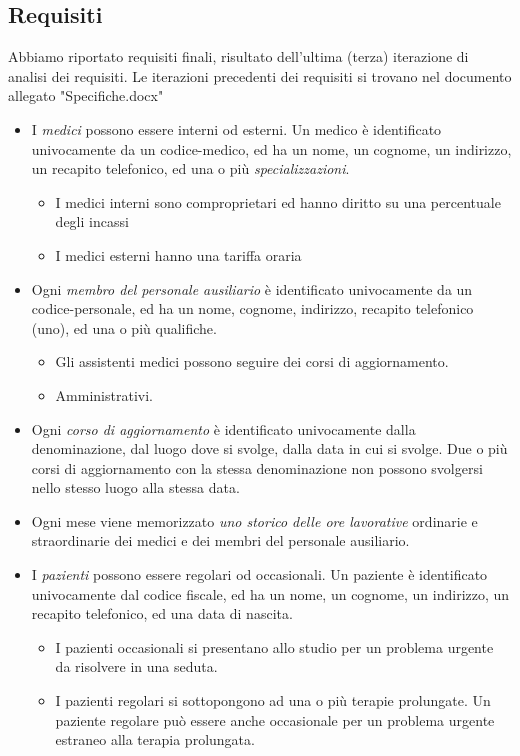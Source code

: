 \documentclass[11pt,a4paper]{article}
\begin{document}
\subsection{Requisiti}
Abbiamo riportato requisiti finali, risultato dell'ultima (terza) iterazione di analisi dei requisiti.
Le iterazioni precedenti dei requisiti si trovano nel documento allegato "Specifiche.docx"
\begin{itemize}
    \item I \emph{medici} possono essere interni od esterni. Un medico è identificato univocamente da un codice-medico, ed ha un nome, un cognome, un indirizzo, un recapito telefonico, ed una o più \emph{specializzazioni}.
    \begin{itemize}
        \item I medici interni sono comproprietari ed hanno diritto su una percentuale degli incassi
        \item I medici esterni hanno una tariffa oraria
    \end{itemize}
    \item Ogni \emph{membro del personale ausiliario} è identificato univocamente da un codice-personale, ed ha un nome, cognome, indirizzo, recapito telefonico (uno), ed una o più qualifiche.
    \begin{itemize}
        \item Gli assistenti medici possono seguire dei corsi di aggiornamento.
        \item Amministrativi.
    \end{itemize}
    \item Ogni \emph{corso di aggiornamento} è identificato univocamente dalla denominazione, dal luogo dove si svolge, dalla data in cui si svolge. Due o più corsi di aggiornamento con la stessa denominazione non possono svolgersi nello stesso luogo alla stessa data.
    \item Ogni mese viene memorizzato \emph{uno storico delle ore lavorative} ordinarie e straordinarie dei medici e dei membri del personale ausiliario.
    \item I \emph{pazienti} possono essere regolari od occasionali. Un paziente è identificato univocamente dal codice fiscale, ed ha un nome, un cognome, un indirizzo, un recapito telefonico, ed una data di nascita.
    \begin{itemize}
        \item I pazienti occasionali si presentano allo studio per un problema urgente da risolvere in una seduta.
        \item I pazienti regolari si sottopongono ad una o più terapie prolungate. Un paziente regolare può essere anche occasionale per un problema urgente estraneo alla terapia prolungata.

\end{itemize}
\end{itemize}
\end{document}
